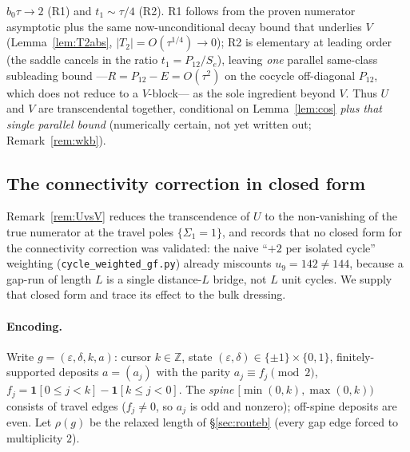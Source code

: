 \begin{remark}
{$b_0\tau\to2$ (R1) and $t_1\sim\tau/4$ (R2). R1 follows from the proven numerator
asymptotic plus the same now-unconditional decay bound that underlies $V$ (Lemma~\ref{lem:T2abs},
$|T_2|=O(\tau^{1/4})\to0$); R2 is elementary at leading order (the saddle cancels in the ratio
$t_1=P_{12}/S_e$), leaving \emph{one} parallel same-class subleading bound
---$R=P_{12}-E=O(\tau^2)$ on the cocycle off-diagonal $P_{12}$, which does not reduce to a
$V$-block--- as the sole ingredient beyond $V$. Thus $U$ and $V$ are transcendental
together, conditional on Lemma~\ref{lem:cos} \emph{plus that single parallel bound}
(numerically certain, not yet written out; Remark~\ref{rem:wkb}).}
\end{remark}

\subsection{The connectivity correction in closed form}\label{ss:cclosed}

Remark~\ref{rem:UvsV} reduces the transcendence of $U$ to the non-vanishing of the true
numerator at the travel poles $\{\Sigma_1=1\}$, and records that no closed form for the
connectivity correction was validated: the naive ``$+2$ per isolated cycle'' weighting
(\texttt{cycle\_weighted\_gf.py}) already miscounts $u_9=142\ne144$, because a gap-run of length
$L$ is a single distance-$L$ bridge, not $L$ unit cycles. We supply that closed form and trace
its effect to the bulk dressing.

\paragraph{Encoding.} Write $g=(\varepsilon,\delta,k,a)$: cursor $k\in\mathbb Z$, state
$(\varepsilon,\delta)\in\{\pm1\}\times\{0,1\}$, finitely-supported deposits $a=(a_j)$ with the
parity $a_j\equiv f_j\pmod2$, $f_j=\mathbf 1[0\le j<k]-\mathbf 1[k\le j<0]$. The \emph{spine}
$[\min(0,k),\max(0,k))$ consists of travel edges ($f_j\ne0$, so $a_j$ is odd and nonzero); off-spine
deposits are even. Let $\rho(g)$ be the relaxed length of \S\ref{sec:routeb} (every gap edge forced
to multiplicity $2$).

